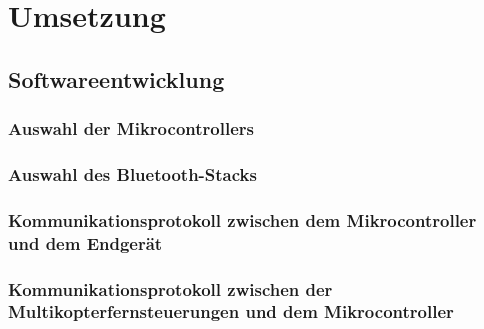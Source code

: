 
\chapter{Umsetzung}

\section{Softwareentwicklung}

\subsection{Auswahl der Mikrocontrollers}

\subsection{Auswahl des Bluetooth-Stacks}

\subsection{Kommunikationsprotokoll zwischen dem Mikrocontroller und dem Endgerät}
\subsection{Kommunikationsprotokoll zwischen der Multikopterfernsteuerungen und dem Mikrocontroller}
